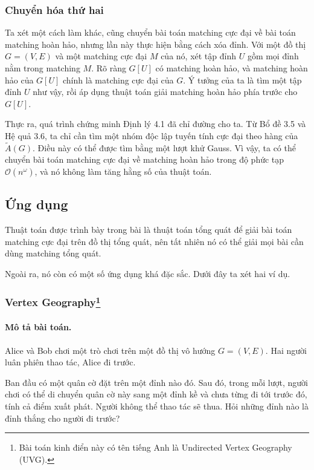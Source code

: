 \documentclass[11pt]{article}
\newcommand{\Oh}{\mathcal{O}}
\begin{document}
\subsubsection{Chuyển hóa thứ hai}

Ta xét một cách làm khác, cũng chuyển bài toán matching cực đại về bài toán
matching hoàn hảo, nhưng lần này thực hiện bằng cách xóa đỉnh. Với một đồ thị
\(G=(V,E)\) và một matching cực đại \(M\) của nó, xét tập đỉnh \(U\) gồm mọi
đỉnh nằm trong matching \(M\). Rõ ràng \(G[U]\) có matching hoàn hảo, và
matching hoàn hảo của \(G[U]\) chính là matching cực đại của \(G\). Ý tưởng
của ta là tìm một tập đỉnh \(U\) như vậy, rồi áp dụng thuật toán giải matching
hoàn hảo phía trước cho \(G[U]\).

Thực ra, quá trình chứng minh Định lý 4.1 đã chỉ đường cho ta. Từ Bổ đề 3.5
và Hệ quả 3.6, ta chỉ cần tìm một nhóm độc lập tuyến tính cực đại theo hàng
của \(\tilde A(G)\). Điều này có thể được tìm bằng một lượt khử Gauss. Vì vậy,
ta có thể chuyển bài toán matching cực đại về matching hoàn hảo trong độ phức
tạp \(\Oh(n^\omega)\), và nó không làm tăng hằng số của thuật toán.

\subsection{Ứng dụng}

Thuật toán được trình bày trong bài là thuật toán tổng quát để giải bài toán
matching cực đại trên đồ thị tổng quát, nên tất nhiên nó có thể giải mọi bài
cần dùng matching tổng quát.

Ngoài ra, nó còn có một số ứng dụng khá đặc sắc. Dưới đây ta xét hai ví dụ.

\subsubsection{Vertex Geography\texorpdfstring{\protect\footnote{Bài toán
kinh điển này có tên tiếng Anh là Undirected Vertex Geography (UVG).}}{}}

\paragraph{Mô tả bài toán.}
Alice và Bob chơi một trò chơi trên một đồ thị vô hướng \(G=(V,E)\). Hai người
luân phiên thao tác, Alice đi trước.

Ban đầu có một quân cờ đặt trên một đỉnh nào đó. Sau đó, trong mỗi lượt, người
chơi có thể di chuyển quân cờ này sang một đỉnh kề và chưa từng đi tới trước
đó, tính cả điểm xuất phát. Người không thể thao tác sẽ thua. Hỏi những đỉnh
nào là đỉnh thắng cho người đi trước?
\end{document}
